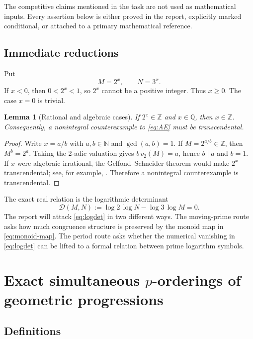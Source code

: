 \documentclass[11pt]{article}
\newtheorem{lemma}[theorem]{Lemma}
\theoremstyle{definition}
\theoremstyle{remark}
\newcommand{\N}{\mathbb N}
\newcommand{\Z}{\mathbb Z}
\newcommand{\Q}{\mathbb Q}
\begin{document}
The competitive claims mentioned in the task are not used as mathematical
inputs.  Every assertion below is either proved in the report, explicitly
marked conditional, or attached to a primary mathematical reference.

\subsection{Immediate reductions}

Put
\[
 M=2^x,\qquad N=3^x.
\]
If $x<0$, then $0<2^x<1$, so $2^x$ cannot be a positive integer.  Thus
$x\geq0$.  The case $x=0$ is trivial.

\begin{lemma}[Rational and algebraic cases]\label{lem:rational-algebraic}
If $2^x\in\Z$ and $x\in\Q$, then $x\in\Z$.  Consequently, a nonintegral
counterexample to \eqref{eq:AE} must be transcendental.
\end{lemma}

\begin{proof}
Write $x=a/b$ with $a,b\in\N$ and $\gcd(a,b)=1$.  If $M=2^{a/b}\in\Z$, then
$M^b=2^a$.  Taking the $2$-adic valuation gives $b\,v_2(M)=a$, hence $b\mid a$
and $b=1$.  If $x$ were algebraic irrational, the Gelfond--Schneider theorem
would make $2^x$ transcendental; see, for example,
\cite[Ch.~1]{Waldschmidt2000}.  Therefore a nonintegral counterexample is
transcendental.
\end{proof}

The exact real relation is the logarithmic determinant
\begin{equation}\label{eq:logdet}
 \mathcal D(M,N):=\log 2\,\log N-\log 3\,\log M=0.
\end{equation}
The report will attack \eqref{eq:logdet} in two different ways.  The
moving-prime route asks how much congruence structure is preserved by the
monoid map in \eqref{eq:monoid-map}.  The period route asks whether the
numerical vanishing in \eqref{eq:logdet} can be lifted to a formal relation
between prime logarithm symbols.

\section{Exact simultaneous $p$-orderings of geometric progressions}

\subsection{Definitions}
\end{document}
